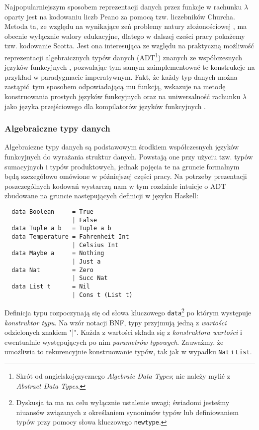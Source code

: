 Najpopularniejszym sposobem reprezentacji danych przez funkcje w rachunku \(\lambda\) oparty jest na kodowaniu liczb Peano za pomocą tzw. liczebników Churcha. Metoda ta, ze względu na wynikające zeń problemy natury złożonościowej \cite{Koopman:2014:CED:2746325.2746330}, ma obecnie wyłącznie walory edukacyjne, dlatego w dalszej cześci pracy pokażemy tzw. kodowanie Scotta. Jest ona interesująca ze względu na praktyczną możliwość reprezentacji algebraicznych typów danych (ADT\footnote{Skrót od angielskojęzycznego \emph{Algebraic Data Types}; nie należy mylić z \emph{Abstract Data Types}.}) znanych ze współczesnych języków funkcyjnych \cite{Jansen:2013:P9C:2941698.2941710}, pozwalając tym samym zaimplementować te konstrukcje na przykład w paradygmacie imperatywnym. Fakt, że każdy typ danych można zastąpić tym sposobem odpowiadającą mu funkcją, wskazuje na metodę konstruowania prostych języków funkcyjnych \cite{Jensen_2006} oraz na uniwersalność rachunku \(\lambda\) jako języka przejściowego dla kompilatorów języków funkcyjnych \cite[Rozdział 3]{PeytonJones:1992:IFL:129390}.

\subsubsection{Algebraiczne typy danych}
Algebraiczne typy danych są podstawowym środkiem współczesnych języków funkcyjnych do wyrażania struktur danych. Powstają one przy użyciu tzw. typów sumacyjnych i typów produktowych, jednak pojęcia te na gruncie formalnym będą szczegółowo omówione w późniejszej części pracy. Na potrzeby prezentacji poszczególnych kodowań wystarczą nam w tym rozdziale intuicje o ADT zbudowane na gruncie następujących definicji w języku Haskell:

\begin{verbatim}
  data Boolean     = True
                   | False
  data Tuple a b   = Tuple a b
  data Temperature = Fahrenheit Int
                   | Celsius Int
  data Maybe a     = Nothing
                   | Just a
  data Nat         = Zero
                   | Succ Nat
  data List t      = Nil
                   | Cons t (List t)
\end{verbatim}
Definicja typu rozpoczynają się od słowa kluczowego \texttt{data}\footnote{Dyskusja ta ma na celu wyłącznie ustalenie uwagi; świadomi jesteśmy niuansów związanych z określaniem synonimów typów lub definiowaniem typów przy pomocy słowa kluczowego \texttt{newtype}.} po którym występuje \emph{konstruktor typu}. Na wzór notacji BNF, typy przyjmują jedną z \emph{wartości} odzielonych znakiem "|". Każda z wartości składa się z \emph{konstruktora wartości} i ewentualnie występujących po nim \emph{parametrów typowych}. Zauważmy, że umożliwia to rekurencyjnie konstruowanie typów, tak jak w wypadku \texttt{Nat} i \texttt{List}.

